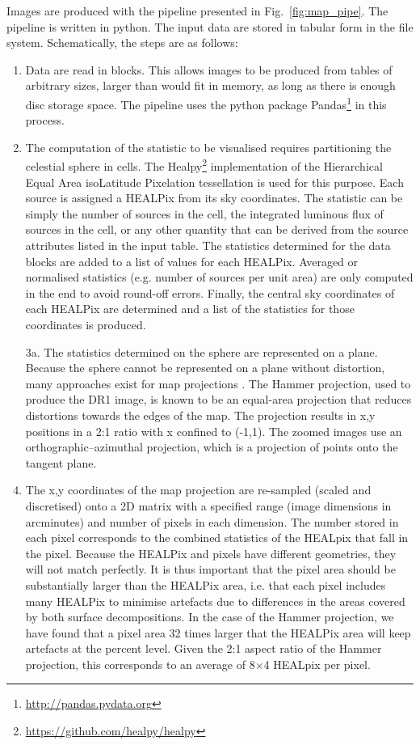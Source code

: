 \documentclass[longauth, final]{aa}
\begin{document}
Images are produced with the pipeline presented in Fig.~\ref{fig:map_pipe}. The pipeline is written in python.
The input data are stored in  tabular form in the file system. 
Schematically, the steps are as follows:
\begin{enumerate}
    \item Data are read in blocks. This allows  images to be produced from tables of arbitrary sizes, larger than would fit in memory, as long as there is enough disc storage space. The pipeline uses the python package Pandas\footnote{\url{http://pandas.pydata.org}}  in this process. 
    \item\label{item:hpx_map} The computation of the statistic to be visualised requires partitioning the celestial sphere in cells. The Healpy\footnote{\url{https://github.com/healpy/healpy}} implementation of the Hierarchical Equal Area isoLatitude Pixelation \citep[HEALPIX, ][]{gorski2005healpix} tessellation is used for this purpose. Each source is assigned a HEALPix from its sky coordinates.
    The statistic can be simply the number of sources in the cell, the integrated luminous flux of sources in the cell, or any other quantity that can be derived from the source attributes listed in the input table. The statistics determined for the data blocks are added to a list of values for each HEALPix. Averaged or normalised statistics (e.g. number of sources per unit area) are only computed in the end to avoid round-off errors. Finally, the central sky coordinates of each HEALPix are determined and a list of the statistics for those coordinates is produced.
    
    \item[3a.] The statistics determined on the sphere are represented on a plane. Because the sphere cannot be represented on a plane without distortion, many approaches exist for map projections \citep{Synder1993}. The Hammer projection, used to produce the DR1 image, is known to be an equal-area projection that reduces distortions towards the edges of the map. The projection results in x,y positions in a 2:1 ratio with x confined to (-1,1). The zoomed images use an orthographic--azimuthal projection, which is a projection of points onto the tangent plane.

    \setcounter{enumi}{3}
    \item The x,y coordinates of the map projection are re-sampled (scaled and discretised) onto a 2D matrix with a specified range (image dimensions in arcminutes) and number of pixels in each dimension. The number stored in each pixel corresponds to the combined statistics of the HEALpix that fall in the pixel. Because the HEALPix and pixels have different geometries, they will not match perfectly. It is thus important that the pixel area should be substantially larger than the HEALPix area, i.e. that each pixel includes many HEALPix to minimise artefacts due to differences in the areas covered by both surface decompositions.  In the case of the Hammer projection, we have found that a pixel area 32 times larger that the HEALPix area will keep artefacts at the percent level. Given the 2:1 aspect ratio of the Hammer projection, this corresponds to an average of 8$\times$4 HEALpix per pixel.


\end{enumerate}
\end{document}
